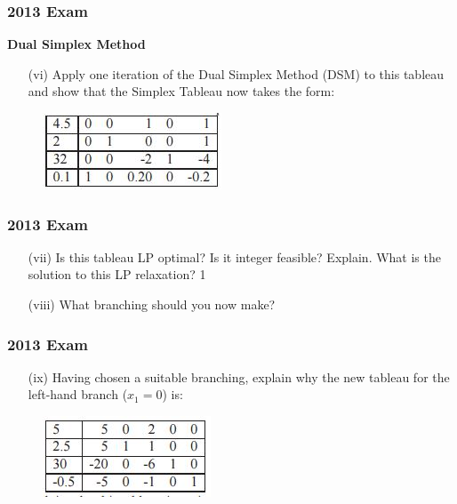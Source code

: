 \documentclass{beamer}
\begin{document}
\begin{frame}
\frametitle{2013 Exam}
\large
\noindent \textbf{Dual Simplex Method}
\begin{itemize}
\item[(vi)] Apply one iteration of the Dual Simplex Method (DSM) to this
tableau and show that the Simplex Tableau now takes the form: 
\end{itemize}


\begin{figure}
\centering
\includegraphics[width=0.7\linewidth]{Exam13-d}
\end{figure}

\end{frame}
\begin{frame}
\frametitle{2013 Exam}
\large
\begin{itemize}
\item[(vii)] Is this tableau LP optimal? Is it integer feasible? Explain. What
is the solution to this LP relaxation? 1
\item[(viii)] What branching should you now make?
\end{itemize}
\end{frame}
\begin{frame}
\frametitle{2013 Exam}
\large
\begin{itemize}
\item[(ix)] Having chosen a suitable branching, explain why the new tableau
for the left-hand branch ($x_1 = 0$) is:
\end{itemize}

\begin{figure}
\centering
\includegraphics[width=0.7\linewidth]{Exam13-PartC}

\end{figure}

\end{frame}
\end{document}

